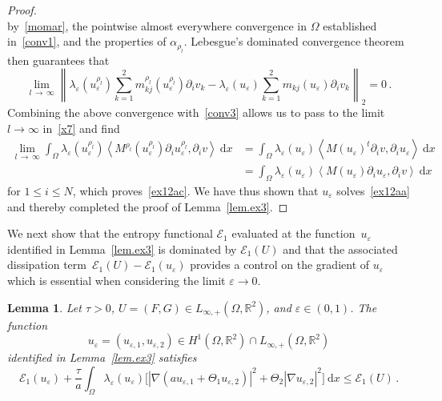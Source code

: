 \documentclass[10pt]{amsart}
\newtheorem{lemm}[theo]{Lemma}\newtheorem{prop}[theo]{Proposition}\newtheorem{coro}[theo]{Corollary}\newtheorem{conj}[theo]{Conjecture}
\theoremstyle{definition}\newtheorem{defi}[theo]{Definition}\newtheorem{rema}[theo]{Remark}\newtheorem{exam}[theo]{Example}\newtheorem{exem}[theo]{Example}\newtheorem{nota}[theo]{Notation}
\newcommand{\bbR}{\mathbb{R}}
\newcommand{\clE}{\mathcal{E}}
\newcommand{\rmd}{\mathrm{d}}
\begin{document}
\begin{proof}
\begin{equation*}
\end{equation*}
by~\eqref{momar}, the pointwise almost everywhere convergence in $\Omega$ established in~\eqref{conv1}, and the properties of $\alpha_{\rho_l}$. Lebesgue's dominated convergence theorem then guarantees that
\begin{equation*}
\lim_{l\,\to\,\infty} \left\| \lambda_\varepsilon(u_\varepsilon^{\rho_l}) \sum_{k=1}^2 m_{kj}^{\rho_l}(u_{\varepsilon}^{\rho_l}) \partial_i v_k - \lambda_\varepsilon(u_\varepsilon) \sum_{k=1}^2 m_{kj}(u_{\varepsilon}) \partial_i v_k \right\|_2 = 0\,.
\end{equation*}
Combining the above convergence with~\eqref{conv3} allows us to pass to the limit $l\to\infty$ in~\eqref{x7} and find
\begin{align*}
\lim_{l\,\to\,\infty} \int_\Omega \lambda_\varepsilon(u_\varepsilon^{\rho_l}) \left\langle M^{\rho_l}(u_{\varepsilon}^{\rho_l}) \partial_i u_{\varepsilon}^{\rho_l}, \partial_i v \right\rangle \ \rmd x & = \int_\Omega \lambda_\varepsilon(u_\varepsilon) \left\langle M(u_{\varepsilon})^t \partial_i v, \partial_i u_{\varepsilon} \right\rangle \ \rmd x \\
& = \int_\Omega \lambda_\varepsilon(u_\varepsilon) \left\langle M(u_{\varepsilon}) \partial_i u_{\varepsilon}, \partial_i v \right\rangle \ \rmd x
\end{align*}
for $1\le i \le N$, which proves~\eqref{ex12ac}. We have thus shown that $u_\varepsilon$ solves~\eqref{ex12aa} and thereby completed the proof of Lemma~\ref{lem.ex3}.
\end{proof}

We next show that the entropy functional $\clE_1$ evaluated at the function~$u_\varepsilon$ identified in Lemma~\ref{lem.ex3} is dominated by $\clE_1(U)$ and that the associated dissipation term~${\clE_1(U)-\clE_1(u_\varepsilon)}$ provides a control on the gradient of $u_\varepsilon$ which is essential when considering the limit $\varepsilon\to 0$.


\begin{lemm}\label{lem.ex4}
Let $\tau>0$, $U=(F,G)\in L_{\infty,+}(\Omega,\bbR^2)$, and $\varepsilon\in (0,1)$. The function
\begin{equation*}
u_{\varepsilon}=(u_{\varepsilon,1},u_{\varepsilon,2})\in H^1\left(\Omega,\bbR^2\right)\cap L_{\infty,+}\left(\Omega,\bbR^2\right)
\end{equation*}
identified in Lemma~\ref{lem.ex3} satisfies
\begin{equation*}
\clE_1(u_{\varepsilon}) + \frac{ \tau}{a} \int_\Omega \lambda_\varepsilon(u_{\varepsilon}) \big[\left|\nabla (a u_{\varepsilon,1} + \Theta_1 u_{\varepsilon,2})\right|^2 + \Theta_2 \left|\nabla u_{\varepsilon,2}\right|^2 \big]\ \rmd x \le \clE_1(U)\,.
\end{equation*}
\end{lemm}
\end{document}
